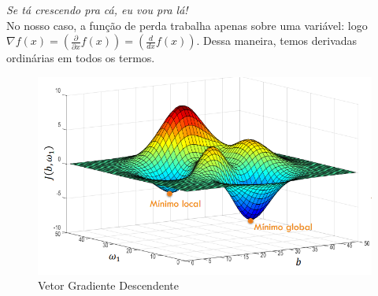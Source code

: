 \textit{Se tá crescendo pra cá, eu vou pra lá!}\\


No nosso caso, a função de perda trabalha apenas sobre uma variável: logo $\nabla f(x) = (\frac{\partial}{\partial x} f(x) )= (\frac{d}{dx}f(x)) $. Dessa maneira, temos derivadas ordinárias em todos os termos. 

\begin{figure}[h]
	\centering
	\includegraphics[width=0.4\linewidth]{imagens/gradiente}
	\caption{Vetor Gradiente Descendente}
	\label{fig:gradiente}
\end{figure}





